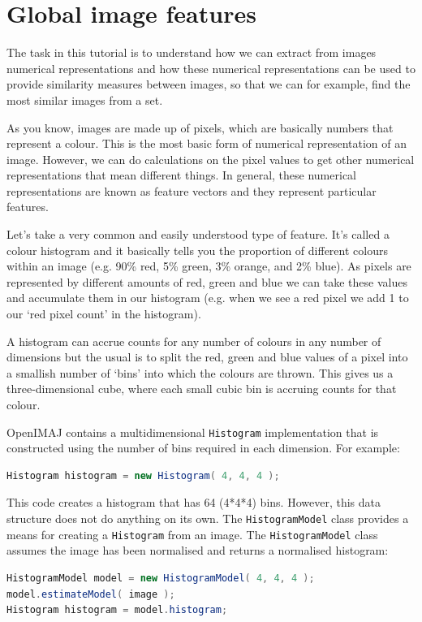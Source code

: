 \documentclass[10pt,a4paper,twoside,extrafontsizes]{memoir}
\begin{document}
\chapter{Global image features}
The task in this tutorial is to understand how we can extract from images numerical representations 
and how these numerical representations can be used to provide similarity measures between images, 
so that we can for example, find the most similar images from a set.

As you know, images are made up of pixels, which are basically numbers that represent a colour. 
This is the most basic form of numerical representation of an image. However, we can do calculations 
on the pixel values to get other numerical representations that mean different things. In general, 
these numerical representations are known as feature vectors and they represent particular features.

Let's take a very common and easily understood type of feature. It's called a colour histogram and 
it basically tells you the proportion of different colours within an image (e.g. 90\% red, 5\% green, 
3\% orange, and 2\% blue). As pixels are represented by different amounts of red, green and blue we 
can take these values and accumulate them in our histogram (e.g. when we see a red pixel we add 1 
to our `red pixel count' in the histogram). 

A histogram can accrue counts for any number of colours in any number of dimensions but the usual 
is to split the red, green and blue values of a pixel into a smallish number of `bins' into which the 
colours are thrown.  This gives us a three-dimensional cube, where each small cubic bin is accruing 
counts for that colour.

OpenIMAJ contains a multidimensional \verb+Histogram+ implementation that is constructed using the number 
of bins required in each dimension. For example:
\begin{lstlisting}[language=java]
Histogram histogram = new Histogram( 4, 4, 4 );
\end{lstlisting}
This code creates a histogram that has 64 (4*4*4) bins. However, this data structure does not do 
anything on its own. The \verb+HistogramModel+ class provides a means for creating a \verb+Histogram+ 
from an image.  The \verb+HistogramModel+ class assumes the image has been normalised and returns a normalised histogram:
\begin{lstlisting}[language=java]
HistogramModel model = new HistogramModel( 4, 4, 4 );
model.estimateModel( image );
Histogram histogram = model.histogram;
\end{lstlisting}
\end{document}
